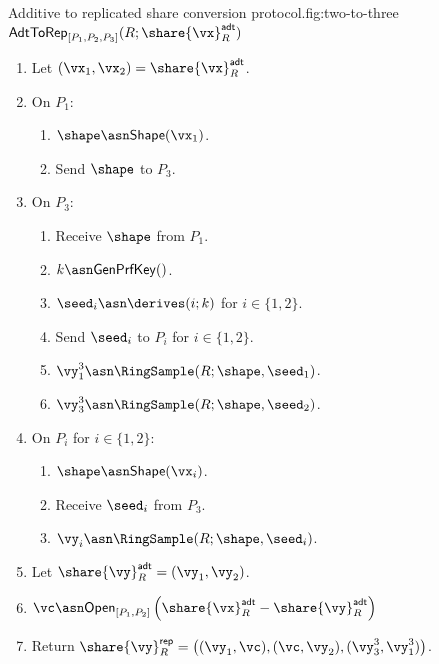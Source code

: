 
\begin{Boxfig}{Additive to replicated share conversion protocol.}{fig:two-to-three}{$\mathsf{AdtToRep}_{[P_1, P_2, P_3]}(R; \share{\vx}^{\mathsf{adt}}_{R})$}
\begin{enumerate}
\item Let $(\vx_1, \vx_2) = \share{\vx}^{\mathsf{adt}}_{R}$.

\item On $P_1$:
\begin{enumerate}
  \item $\shape \asn \mathsf{Shape}(\vx_1)$.
  \item Send $\shape$ to $P_3$.
\end{enumerate}

\item On $P_3$:
\begin{enumerate}
  \item Receive $\shape$ from $P_1$.
  \item $k \asn \mathsf{GenPrfKey}()$.
  \item $\seed_i \asn \derives(i; k)$ for $i \in \{1, 2\}$.
  \item Send $\seed_i$ to $P_i$ for $i \in \{1, 2\}$.
  \item $\vy_1^3 \asn \RingSample(R; \shape, \seed_1)$.
  \item $\vy_3^3 \asn \RingSample(R; \shape, \seed_2)$.
\end{enumerate}

\item On $P_i$ for $i \in \{1,2\}$:
\begin{enumerate}
  \item $\shape \asn \mathsf{Shape}(\vx_i)$.
  \item Receive $\seed_i$ from $P_3$.
  \item $\vy_i \asn \RingSample(R; \shape, \seed_i)$.
\end{enumerate}

\item Let $\share{\vy}^{\mathsf{adt}}_{R} = (\vy_1, \vy_2)$.

\item $\vc \asn \mathsf{Open}_{[P_1, P_2]}\left( \share{\vx}^{\mathsf{adt}}_{R} - \share{\vy}^{\mathsf{adt}}_{R} \right)$

\item Return $\share{\vy}^{\mathsf{rep}}_{R} = \left( (\vy_1, \vc), (\vc, \vy_2), (\vy_3^3, \vy_1^3) \right)$.
\end{enumerate}
\end{Boxfig}

